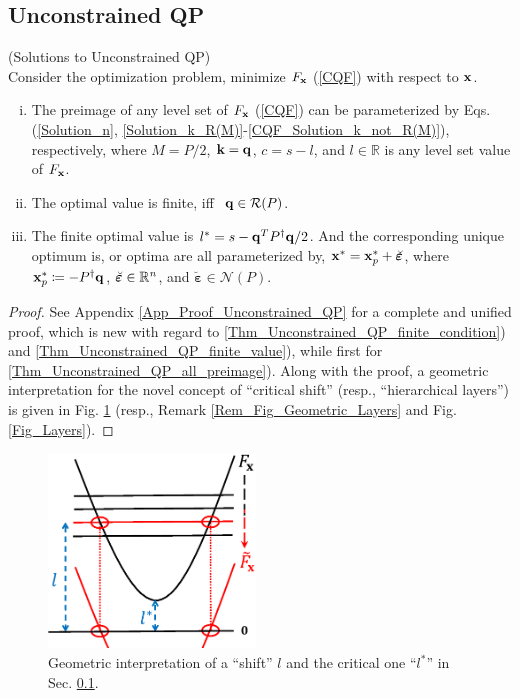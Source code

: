 \documentclass{imaman}
\newcommand{\bfx}{{\bf x}}
\newcommand{\bfq}{{\bf q}}
\newcommand{\bfk}{{\bf k}}
\newcommand{\bfvarepsilon}{{\boldsymbol \varepsilon}}
\newcommand{\real}{\mathbb{R}}
\newcommand{\calN}{{\mathcal N}}
\newcommand{\calR}{{\mathcal R}}
\newcommand{\itn}{{\it n}}
\numberwithin{equation}{section}
\begin{document}
\subsection{Unconstrained QP}
\label{Subsec_Unconstrained_QP}

\begin{theorem} (Solutions to Unconstrained QP)\\
Consider the optimization problem, minimize $F_\bfx$ {\rm(\ref{CQF})} with respect to $\bfx$.
\begin{enumerate}[i)]
\item\label{Thm_Unconstrained_QP_all_preimage} The preimage of any level set of $F_\bfx$ {\rm(\ref{CQF})} can be parameterized by Eqs. {\rm(\ref{Solution_n}}, {\rm\ref{Solution_k_R(M)}-\ref{CQF_Solution_k_not_R(M)})}, respectively, where $M=P/2$, $\bfk=\bfq$, $c=s-l$, and $l\in\real$ is any level set value of $F_\bfx$.
\item\label{Thm_Unconstrained_QP_finite_condition} The optimal value is finite, iff $~\bfq\in\calR(P)$.
\item\label{Thm_Unconstrained_QP_finite_value} The finite optimal value is $l^*=s-\bfq^T P^\dagger\bfq/2$. And the corresponding unique optimum is, or optima are all parameterized by, $\bfx^*=\bfx_p^*+\breve\bfvarepsilon$, where $\bfx_p^*\coloneqq-P^\dagger\bfq$, $\breve\bfvarepsilon\in\real^\itn$, and $\breve\bfvarepsilon\in \calN(P)$.
\end{enumerate}
\label{Thm_Unconstrained_QP}
\end{theorem}

\begin{proof}
See Appendix \ref{App_Proof_Unconstrained_QP} for a complete and unified proof, which is new with regard to \ref{Thm_Unconstrained_QP_finite_condition}) and \ref{Thm_Unconstrained_QP_finite_value}), while first for \ref{Thm_Unconstrained_QP_all_preimage}). Along with the proof, a geometric interpretation for the novel concept of ``critical shift'' (resp., ``hierarchical layers'') is given in Fig. \ref{Fig_Shift} (resp., Remark \ref{Rem_Fig_Geometric_Layers} and Fig. \ref{Fig_Layers}).
\end{proof}


\begin{figure}[htbp]
    \begin{center}
    \includegraphics[width=5.5cm]{Fig_Shift.eps}
    \caption{Geometric interpretation of a ``shift'' $l$ and the critical one ``$l^*$'' in Sec. {\rm\ref{Subsec_Unconstrained_QP}}.}
    \label{Fig_Shift}
    \end{center}
\end{figure}
\end{document}
